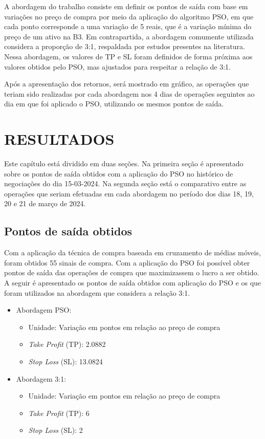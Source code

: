 \documentclass{iftex2024}
\begin{document}
A abordagem do trabalho consiste em definir os pontos de saída com base em variações no preço de compra por meio da 
aplicação do algoritmo PSO, em que cada ponto corresponde a uma variação de 5 reais, 
que é a variação mínima do preço de um ativo na B3. Em contrapartida, a abordagem comumente utilizada considera a 
proporção de 3:1, respaldada por estudos presentes na literatura. Nessa abordagem, os valores de TP e SL foram definidos 
de forma próxima aos valores obtidos pelo PSO, mas ajustados para respeitar a relação de 3:1.

Após a apresentação dos retornos, será mostrado em gráfico, as operações que teriam sido
realizadas por cada abordagem nos 4 dias de operações seguintes ao dia em que foi aplicado o PSO,
utilizando os mesmos pontos de saída. 

\chapter{RESULTADOS}

Este capítulo está dividido em duas seções. Na primeira seção é apresentado sobre os 
pontos de saída obtidos com a aplicação do PSO no histórico de negociações
do dia 15-03-2024. Na segunda seção está o comparativo entre as operações que seriam
efetuadas em cada abordagem no período dos dias 18, 19, 20 e 21 de março de 2024.

\section{Pontos de saída obtidos}

Com a aplicação da técnica de compra baseada em cruzamento de médias
móveis, foram obtidos 55 sinais de compra. Com a aplicação do PSO foi possível obter
pontos de saída das operações de compra que maximizassem o lucro a ser obtido. A seguir
é apresentado os pontos de saída obtidos com aplicação do PSO e os que foram utilizados
na abordagem que considera a relação 3:1.

\begin{itemize}
  \item Abordagem PSO:
      \begin{itemize}
          \item Unidade: Variação em pontos em relação ao preço de compra
          \item \textit{Take Profit} (TP): 2.0882
          \item \textit{Stop Loss} (SL): 13.0824
      \end{itemize}
  \item Abordagem 3:1:
      \begin{itemize}
          \item Unidade: Variação em pontos em relação ao preço de compra
          \item \textit{Take Profit} (TP): 6
          \item \textit{Stop Loss} (SL): 2
      \end{itemize}
\end{itemize}
\end{document}
